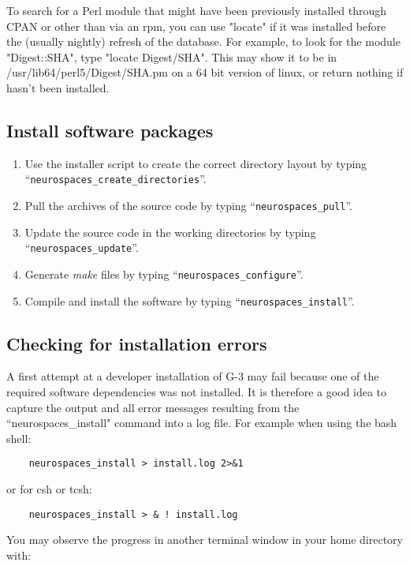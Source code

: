 \documentclass[12pt]{article}
\begin{document}
To search for a Perl module that might have been previously installed
through CPAN or other than via an rpm, you can use "locate" if it was
installed before the (usually nightly) refresh of the database.	 For
example, to look for the module "Digest::SHA", type "locate Digest/SHA".
This may show it to be in /usr/lib64/perl5/Digest/SHA.pm on a 64 bit
version of linux, or return nothing if hasn't been installed.

\subsection*{Install software packages}

\begin{enumerate}
   \item Use the installer script to create the correct directory layout by typing ``{\tt neurospaces\_create\_directories}''.
   \item Pull the archives of the source code by typing ``{\tt neurospaces\_pull}''.
   \item Update the source code in the working directories by typing ``{\tt neurospaces\_update}''.
   \item Generate {\it make} files by typing ``{\tt neurospaces\_configure}''.
   \item Compile and install the software by typing ``{\tt neurospaces\_install}''.
\end{enumerate}

\subsection*{Checking for installation errors}

A first attempt at a developer installation of G-3 may fail because
one of the required software dependencies was not installed.  It is
therefore a good idea to capture the output and all error messages
resulting from the ``neurospaces\_install" command into a log file.
For example when using the bash shell:

\begin{verbatim}
    neurospaces_install > install.log 2>&1
\end{verbatim}

or for csh or tcsh:

\begin{verbatim}
    neurospaces_install > & ! install.log
\end{verbatim}

You may observe the progress in another terminal window in your home
directory with:
\end{document}
